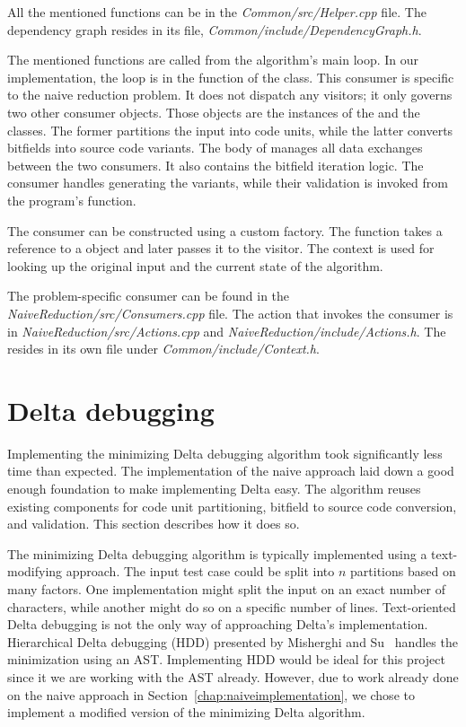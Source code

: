 All the mentioned functions can be in the \emph{Common/\-src/\-Helper.cpp} 
file. 
The dependency graph resides in its file, 
\emph{Common/\-include/\-DependencyGraph.h}.

The mentioned functions are called from the algorithm's main loop. 
In our implementation, the loop is in the  
function of the  class. 
This consumer is specific to the naive reduction problem. 
It does not dispatch any visitors; it only governs two other consumer 
objects. 
Those objects are the instances of 
the  and 
the  classes. 
The former partitions the input into code units, while the latter converts 
bitfields into source code variants. 
The body of  manages all data exchanges 
between the two consumers. 
It also contains the bitfield iteration logic. 
The consumer handles generating the variants, while their validation is 
invoked from the program's  function. 

The consumer can be constructed using a custom factory. 
The  function takes 
a reference to a  object and later passes it to 
the visitor. 
The context is used for looking up the original input and the current state of the algorithm.

The problem-specific consumer can be found in 
the \emph{NaiveReduction/\-src/\-Consumers.cpp} file. 
The action that invokes the consumer is 
in \emph{NaiveReduction/\-src/\-Actions.cpp} and 
\emph{NaiveReduction/\-include/\-Actions.h}. 
The  resides in its own file under 
\emph{Common/\-include/\-Context.h}.

\section{Delta debugging}\label{chap:deltaimplementation}

Implementing the minimizing Delta debugging algorithm took significantly 
less time than expected. 
The implementation of the naive approach laid down a good enough foundation 
to make implementing Delta easy. 
The algorithm reuses existing components for code unit partitioning, 
bitfield to source code conversion, and validation. 
This section describes how it does so.

The minimizing Delta debugging algorithm is typically implemented using 
a text-modifying approach. 
The input test case could be split into $n$ partitions based on many factors.
One implementation might split the input on an exact number of characters, 
while another might do so on a specific number of lines. 
Text-oriented Delta debugging is not the only way of approaching Delta's 
implementation. 
Hierarchical Delta debugging (HDD) presented by Misherghi and 
Su~\citep{Misherghi06} handles the minimization using an AST. 
Implementing HDD would be ideal for this project since it we are working 
with the AST already. 
However, due to work already done on the naive approach in 
Section~\ref{chap:naiveimplementation}, we chose to implement a modified 
version of the minimizing Delta algorithm. 

